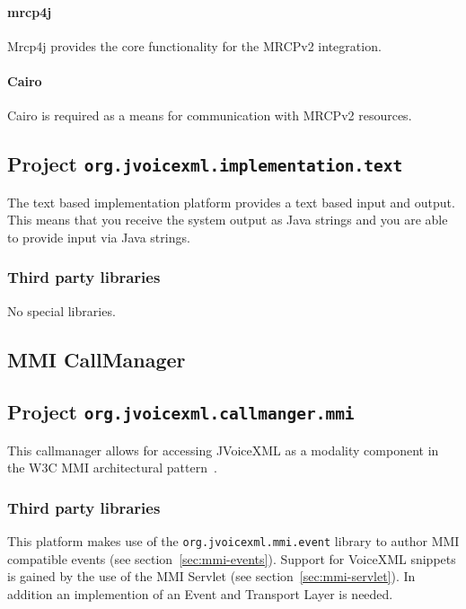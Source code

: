 \documentclass[11pt,a4paper]{article}
\begin{document}
\paragraph{mrcp4j}

Mrcp4j provides the core functionality for the MRCPv2 integration.

\paragraph{Cairo}

Cairo is required as a means for communication with MRCPv2 resources.

\subsection{Project \texttt{org.jvoicexml.implementation.text}}

The text based implementation platform provides a text based input and output.
This means that you receive the system output as Java strings and you are able
to provide input via Java strings.

\subsubsection{Third party libraries}
\label{sec:text-third-party-libr}

No special libraries.

\subsection{MMI CallManager}
\subsection{Project \texttt{org.jvoicexml.callmanger.mmi}}

This callmanager allows for accessing JVoiceXML as a modality component in
the W3C MMI architectural pattern~\cite{w3c:2012:mmi_arch}.

\subsubsection{Third party libraries}

This platform makes use of the \lstinline{org.jvoicexml.mmi.event} library
to author MMI compatible events (see section~\ref{sec:mmi-events}).
Support for VoiceXML snippets is gained by the use of the MMI Servlet
(see section~\ref{sec:mmi-servlet}).
In addition an implemention of an Event and Transport Layer is needed.
\end{document}
